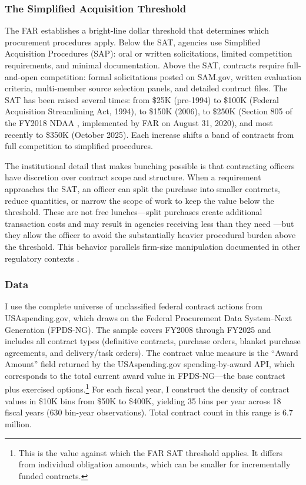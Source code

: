 \documentclass[12pt]{article}
\begin{document}
\subsubsection*{The Simplified Acquisition Threshold} The FAR establishes a bright-line dollar threshold that determines which procurement procedures apply. Below the SAT, agencies use Simplified Acquisition Procedures (SAP): oral or written solicitations, limited competition requirements, and minimal documentation. Above the SAT, contracts require full-and-open competition: formal solicitations posted on SAM.gov, written evaluation criteria, multi-member source selection panels, and detailed contract files. The SAT has been raised several times: from \$25K (pre-1994) to \$100K (Federal Acquisition Streamlining Act, 1994), to \$150K (2006), to \$250K (Section 805 of the FY2018 NDAA \citep{ndaa2018}, implemented by FAR on August 31, 2020), and most recently to \$350K (October 2025). Each increase shifts a band of contracts from full competition to simplified procedures.

The institutional detail that makes bunching possible is that contracting officers have discretion over contract scope and structure. When a requirement approaches the SAT, an officer can split the purchase into smaller contracts, reduce quantities, or narrow the scope of work to keep the value below the threshold. These are not free lunches---split purchases create additional transaction costs and may result in agencies receiving less than they need \citep{kang2023}---but they allow the officer to avoid the substantially heavier procedural burden above the threshold. This behavior parallels firm-size manipulation documented in other regulatory contexts \citep{best2023, coviello2018}.

\subsubsection*{Data} I use the complete universe of unclassified federal contract actions from USAspending.gov, which draws on the Federal Procurement Data System--Next Generation (FPDS-NG). The sample covers FY2008 through FY2025 and includes all contract types (definitive contracts, purchase orders, blanket purchase agreements, and delivery/task orders). The contract value measure is the ``Award Amount'' field returned by the USAspending.gov spending-by-award API, which corresponds to the total current award value in FPDS-NG---the base contract plus exercised options.\footnote{This is the value against which the FAR SAT threshold applies. It differs from individual obligation amounts, which can be smaller for incrementally funded contracts.} For each fiscal year, I construct the density of contract values in \$10K bins from \$50K to \$400K, yielding 35 bins per year across 18 fiscal years (630 bin-year observations). Total contract count in this range is 6.7 million.
\end{document}
